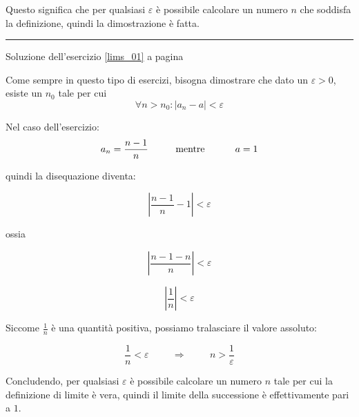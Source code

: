 Questo significa che per qualsiasi $\varepsilon$ è possibile calcolare un numero $n$ che soddisfa la definizione, quindi la dimostrazione è fatta.

\vspace{1cm}
\hrule
\vspace{1cm}



Soluzione dell'esercizio \ref{lims_01} a pagina \pageref{lims_01}\label{limss_01}

Come sempre in questo tipo di esercizi, bisogna dimostrare che dato un $\varepsilon > 0$, esiste un $n_0$ tale per cui
\begin{equation*}
\forall n>n_0: \left| a_n - a \right| < \varepsilon
\end{equation*}

Nel caso dell'esercizio:
\begin{equation*}
a_n = \frac{n-1}{n} \textrm{\hspace{1cm}mentre \hspace{1cm}} a=1
\end{equation*}

quindi la disequazione diventa:

\begin{equation*}
\left| \frac{n-1}{n} -1 \right| < \varepsilon
\end{equation*}

ossia

\begin{equation*}
\left| \frac{n-1-n}{n} \right| < \varepsilon
\end{equation*}

\begin{equation*}
\left| \frac{1}{n} \right| < \varepsilon
\end{equation*}

Siccome $\frac{1}{n}$ è una quantità positiva, possiamo tralasciare il valore assoluto:


\begin{equation*}
\frac{1}{n} < \varepsilon \hspace{1cm} \Rightarrow  \hspace{1cm} n > \frac{1}{\varepsilon}
\end{equation*}

Concludendo, per qualsiasi $\varepsilon$ è possibile calcolare un numero $n$ tale per cui la definizione di limite è vera, quindi il limite della successione è effettivamente pari a $1$.



